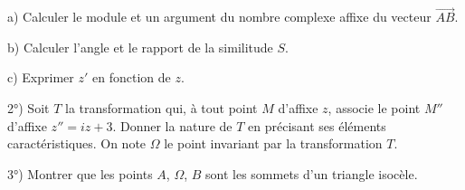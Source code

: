 \documentclass[12pt]{article}
\begin{document}
a) Calculer le module et un argument du nombre complexe affixe du vecteur $\vec{AB}$.

b) Calculer l’angle et le rapport de la similitude $S$.

c) Exprimer $z'$ en fonction de $z$.

2°) Soit $T$ la transformation qui, à tout point $M$ d’affixe $z$, associe le point $M''$ d’affixe $z'' = iz + 3$. Donner la nature de $T$ en précisant ses éléments caractéristiques. On note $\Omega$ le point invariant par la transformation $T$.

3°) Montrer que les points $A$, $\Omega$, $B$ sont les sommets d’un triangle isocèle.
\end{document}
